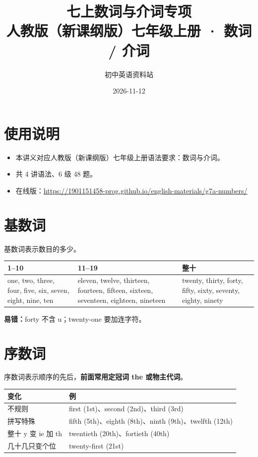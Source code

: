 \documentclass[11pt,a4paper]{ctexart}
\title{\textbf{七上数词与介词专项}\\[4pt]
\large 人教版（新课纲版）七年级上册 · 数词 / 介词}
\author{初中英语资料站}
\date{2026-11-12}
\begin{document}
\maketitle

\section*{使用说明}
\begin{itemize}[leftmargin=1.4em]
\item 本讲义对应人教版（新课纲版）七年级上册语法要求：数词与介词。
\item 共 4 讲语法、6 级 48 题。
\item 在线版：\url{https://1901151458-prog.github.io/english-materials/g7a-numbers/}
\end{itemize}

\section{基数词}
基数词表示数目的多少。
\begin{center}
\begin{tabular}{p{4.4cm}p{4.4cm}p{4.4cm}}
\hline
\textbf{1--10} & \textbf{11--19} & \textbf{整十}\\
\hline
one, two, three, four, five, six, seven, eight, nine, ten & eleven, twelve, thirteen, fourteen, fifteen, sixteen, seventeen, eighteen, nineteen & twenty, thirty, forty, fifty, sixty, seventy, eighty, ninety\\
\hline
\end{tabular}
\end{center}
\textbf{易错：}forty 不含 u；twenty-one 要加连字符。

\section{序数词}
序数词表示顺序的先后，\textbf{前面常用定冠词 the 或物主代词}。
\begin{center}
\begin{tabular}{p{4.6cm}p{8.4cm}}
\hline
\textbf{变化} & \textbf{例}\\
\hline
不规则 & first (1st)、second (2nd)、third (3rd)\\
拼写特殊 & fifth (5th)、eighth (8th)、ninth (9th)、twelfth (12th)\\
整十 y 变 ie 加 th & twentieth (20th)、fortieth (40th)\\
几十几只变个位 & twenty-first (21st)\\
\hline
\end{tabular}
\end{center}
\end{document}
